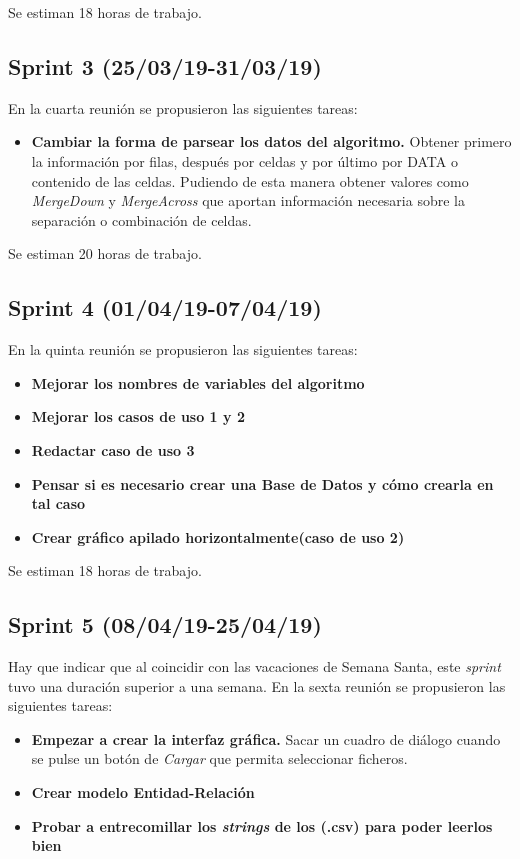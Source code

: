 Se estiman 18 horas de trabajo.

\subsection{Sprint 3 (25/03/19-31/03/19)}
En la cuarta reunión se propusieron las siguientes tareas:

\begin{itemize}
\item
\textbf{Cambiar la forma de parsear los datos del algoritmo.} Obtener primero la información por filas, después por celdas y por último por DATA o contenido de las celdas. Pudiendo de esta manera obtener valores como \emph{MergeDown} y \emph{MergeAcross} que aportan información necesaria sobre la separación o combinación de celdas.   
\end{itemize}

Se estiman 20 horas de trabajo.

\subsection{Sprint 4 (01/04/19-07/04/19)}
En la quinta reunión se propusieron las siguientes tareas:

\begin{itemize}
\item
\textbf{Mejorar los nombres de variables del algoritmo}
\item
\textbf{Mejorar los casos de uso 1 y 2}
\item
\textbf{Redactar caso de uso 3}
\item
\textbf{Pensar si es necesario crear una Base de Datos y cómo crearla en tal caso}
\item
\textbf{Crear gráfico apilado horizontalmente(caso de uso 2)}
\end{itemize}

Se estiman 18 horas de trabajo.

\subsection{Sprint 5 (08/04/19-25/04/19)}
Hay que indicar que al coincidir con las vacaciones de Semana Santa, este \emph{sprint} tuvo una duración superior a una semana. En la sexta reunión se propusieron las siguientes tareas:

\begin{itemize}
\item
\textbf{Empezar a crear la interfaz gráfica.} Sacar un cuadro de diálogo cuando se pulse un botón de \emph{Cargar} que permita seleccionar ficheros.
\item
\textbf{Crear modelo Entidad-Relación}
\item
\textbf{Probar a entrecomillar los \emph{strings} de los (.csv) para poder leerlos bien}
\end{itemize}


